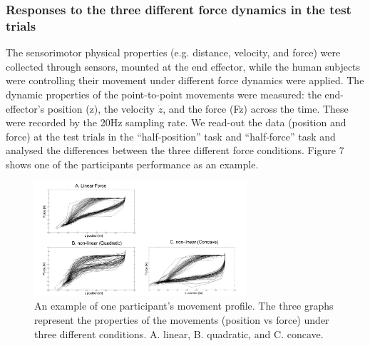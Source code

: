 \subsubsection{Responses to the three different force dynamics in the test trials}
The sensorimotor physical properties (e.g. distance, velocity, and force) were collected through sensors, mounted at the end effector, while the human subjects were controlling their movement under different force dynamics were applied. The dynamic properties of the point-to-point movements were measured: the end-effector’s position (z), the velocity $\dot{z}$, and the force (Fz) across the time. These were recorded by the 20Hz sampling rate. We read-out the data (position and force) at the test trials in the “half-position” task and “half-force” task and analysed the differences between the three different force conditions. Figure 7 shows one of the participants performance as an example.
%
\begin{figure}
	\centering
	\includegraphics[width=0.7\textwidth]{Chie/figs/Figure7.png}
	\caption{An example of one participant’s movement profile. The three graphs represent the properties of the movements (position vs force) under three different conditions. A. linear, B. quadratic, and C. concave.}
	\label{modelling}
\end{figure}
